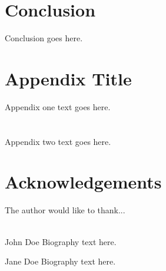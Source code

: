 \documentclass[12pt,journal,compsoc]{IEEEtran}
\begin{document}
\section{Conclusion}
Conclusion goes here.

\appendices
\section{Appendix Title}
Appendix one text goes here.

\section{}
Appendix two text goes here.


\section*{Acknowledgements}

The author would like to thank...\\ \\


\begin{IEEEbiographynophoto}{John Doe}
Biography text here.
\end{IEEEbiographynophoto}


\begin{IEEEbiographynophoto}{Jane Doe}
Biography text here.
\end{IEEEbiographynophoto}
\end{document}
